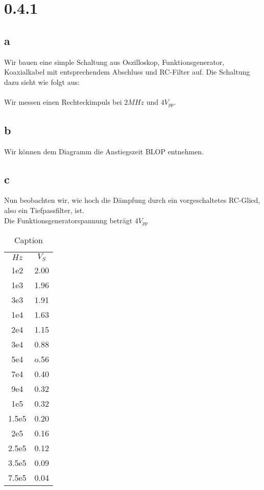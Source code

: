 \documentclass[main.tex]{subfiles}
\begin{document}
\section{0.4.1}
\subsection{a}
Wir bauen eine simple Schaltung aus Oszilloskop, Funktionsgenerator, Koaxialkabel mit entsprechendem Abschluss und RC-Filter auf. Die Schaltung dazu sieht wie folgt aus:\\
\\
Wir messen einen Rechteckimpuls bei $2 MHz$ und $4 V_{pp}$. 
\subsection{b}

Wir können dem Diagramm die Anstiegszeit BLOP entnehmen.

\subsection{c}
Nun beobachten wir, wie hoch die Dämpfung durch ein vorgeschaltetes RC-Glied, also ein Tiefpassfilter, ist. \\
Die Funktionsgeneratorspannung beträgt $4 V_{pp}$
\begin{table}[]
    \centering
    \begin{tabular}{c|c}
         $Hz$ & $V_S$ \hline\\
         1e2 & 2.00 \\
         1e3 & 1.96 \\
         3e3 & 1.91 \\
         1e4 & 1.63 \\
         2e4 & 1.15 \\
         3e4 & 0.88 \\
         5e4 & o.56 \\
         7e4 & 0.40 \\
         9e4 & 0.32 \\
         1e5 & 0.32 \\
         1.5e5 & 0.20 \\
         2e5 & 0.16 \\
         2.5e5 & 0.12 \\
         3.5e5 & 0.09 \\
         7.5e5 & 0.04
         
    \end{tabular}
    \caption{Caption}
    \label{tab:my_label}
\end{table}
\end{document}
